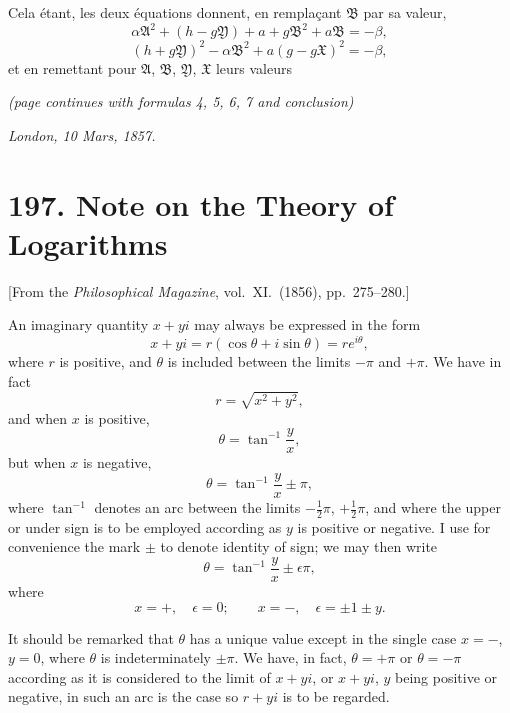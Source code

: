 \documentclass[12pt,a4paper]{article}
\theoremstyle{definition}
\begin{document}
Cela \'etant, les deux \'equations donnent, en rempla\c{c}ant $\mathfrak{B}$ par sa valeur,
\[
\alpha\mathfrak{A}^2 + (h - g\mathfrak{Y}) + a + g\mathfrak{B}^2 + a\mathfrak{B} = -\beta,
\]
\[
(h + g\mathfrak{Y})^2 - \alpha\mathfrak{B}^2 + a(g - g\mathfrak{X})^2 = -\beta,
\]
et en remettant pour $\mathfrak{A}$, $\mathfrak{B}$, $\mathfrak{Y}$, $\mathfrak{X}$ leurs valeurs

\noindent\textit{(page continues with formulas 4, 5, 6, 7 and conclusion)}

\medskip

\noindent\textit{London, 10 Mars, 1857.}

\newpage


\section*{197. Note on the Theory of Logarithms}

\begin{center}
[From the \textit{Philosophical Magazine}, vol.~XI.~(1856), pp.~275--280.]
\end{center}

\bigskip

An imaginary quantity $x+yi$ may always be expressed in the form
\[
x + yi = r(\cos\theta + i\sin\theta) = r e^{i\theta},
\]
where $r$ is positive, and $\theta$ is included between the limits $-\pi$ and $+\pi$. We have
in fact
\[
r = \sqrt{x^2 + y^2},
\]
and when $x$ is positive,
\[
\theta = \tan^{-1}\frac{y}{x},
\]
but when $x$ is negative,
\[
\theta = \tan^{-1}\frac{y}{x} \pm \pi,
\]
where $\tan^{-1}$ denotes an arc between the limits $-\tfrac{1}{2}\pi$, $+\tfrac{1}{2}\pi$, and where the upper
or under sign is to be employed according as $y$ is positive or negative. I use for convenience
the mark $\pm$ to denote identity of sign; we may then write
\[
\theta = \tan^{-1}\frac{y}{x} \pm \epsilon\pi,
\]
where
\[
x = +, \quad \epsilon = 0;\qquad x = -,\quad \epsilon = \pm 1 \pm y.
\]

\medskip

It should be remarked that $\theta$ has a unique value except in the single case
$x = -$, $y = 0$, where $\theta$ is indeterminately $\pm\pi$. We have, in fact, $\theta = +\pi$ or $\theta = -\pi$
according as it is considered to the limit of $x + yi$, or $x + yi$, $y$ being positive
or negative, in such an arc is the case so $r + yi$ is to be regarded.

\medskip
\end{document}
